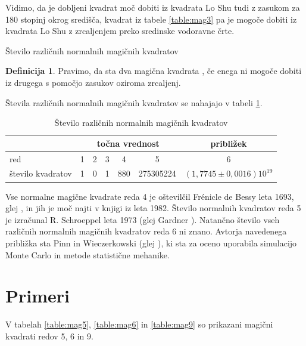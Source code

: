 \documentclass[a4paper,12pt]{article}
\theoremstyle{definition}
\newtheorem{definicija}{Definicija}
\theoremstyle{plain}
\newcommand{\pojem}[1]{\emph{\color{purple}{#1}}}
\begin{document}
Vidimo, da je dobljeni kvadrat moč dobiti iz kvadrata Lo Shu tudi z zasukom za
180 stopinj okrog središča, kvadrat iz tabele \ref{table:mag3} pa je mogoče dobiti
iz kvadrata Lo Shu z zrcaljenjem preko sredinske vodoravne črte.

Število različnih normalnih magičnih kvadratov

\begin{definicija}
      Pravimo, da sta dva magična kvadrata \pojem{različna}, če enega ni mogoče dobiti
      iz drugega s pomočjo zasukov oziroma zrcaljenj.
\end{definicija}

Števila različnih normalnih magičnih kvadratov se nahajajo v tabeli \ref{table:stevila}.

\begin{table}
   \centering
   \caption{Število različnih normalnih magičnih kvadratov}
   \label{table:stevila}
   \begin{tabular}{lcccccc}\toprule
      & \multicolumn{5}{c}{točna vrednost} & približek\\
      \midrule
      red & 1 & 2 & 3 & 4 & 5 & 6\\
      število kvadratov & 1 & 0 & 1 & 880 & 275305224 & $(1,7745 \pm 0,0016)10^{19}$\\
      \bottomrule
   \end{tabular}
\end{table}

Vse normalne magične kvadrate reda 4 je oštevilčil Frénicle de Bessy
leta 1693, glej \cite{bessy}, in jih je moč najti v knjigi \cite{berlekamp}
iz leta 1982. Število normalnih kvadratov reda 5 je izračunal
R. Schroeppel leta 1973 (glej Gardner \cite{gardner}).
Natančno število vseh različnih normalnih magičnih kvadratov reda 6 ni znano.
Avtorja navedenega približka sta Pinn in Wieczerkowski (glej \cite{pinn}), ki
sta za oceno uporabila simulacijo Monte Carlo in metode statistične mehanike.


\section{Primeri}

V tabelah \ref{table:mag5}, \ref{table:mag6} in \ref{table:mag9} so prikazani
magični kvadrati redov 5, 6 in 9.
\end{document}
